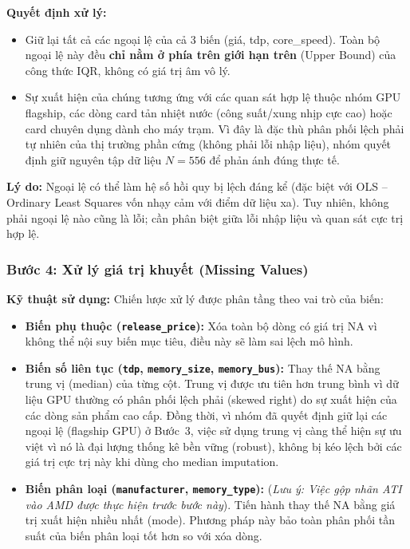 \documentclass[12pt,a4paper]{article}
\begin{document}
\textbf{Quyết định xử lý:}

\begin{itemize}[leftmargin=1.5em]
  \item Giữ lại tất cả các ngoại lệ của cả 3 biến (giá, tdp, core\_speed). Toàn bộ
        ngoại lệ này đều \textbf{chỉ nằm ở phía trên giới hạn trên} (Upper Bound) của
        công thức IQR, không có giá trị âm vô lý.

  \item Sự xuất hiện của chúng tương ứng với các quan sát hợp lệ thuộc nhóm GPU flagship,
        các dòng card tản nhiệt nước (công suất/xung nhịp cực cao) hoặc card chuyên dụng
        dành cho máy trạm. Vì đây là đặc thù phân phối lệch phải tự nhiên của thị trường
        phần cứng (không phải lỗi nhập liệu), nhóm quyết định giữ nguyên tập dữ liệu
        $N = 556$ để phản ánh đúng thực tế.
\end{itemize}

\textbf{Lý do:} Ngoại lệ có thể làm hệ số hồi quy bị lệch đáng kể (đặc biệt với OLS --
Ordinary Least Squares vốn nhạy cảm với điểm dữ liệu xa). Tuy nhiên, không phải ngoại lệ
nào cũng là lỗi; cần phân biệt giữa lỗi nhập liệu và quan sát cực trị hợp lệ.

\subsubsection*{Bước 4: Xử lý giá trị khuyết (Missing Values)}

\textbf{Kỹ thuật sử dụng:} Chiến lược xử lý được phân tầng theo vai trò của biến:

\begin{itemize}[leftmargin=1.5em]
  \item \textbf{Biến phụ thuộc (\texttt{release\_price}):} Xóa toàn bộ dòng có giá trị
        NA vì không thể nội suy biến mục tiêu, điều này sẽ làm sai lệch mô hình.

  \item \textbf{Biến số liên tục (\texttt{tdp}, \texttt{memory\_size},
        \texttt{memory\_bus}):} Thay thế NA bằng trung vị (median) của từng cột. Trung vị
        được ưu tiên hơn trung bình vì dữ liệu GPU thường có phân phối lệch phải
        (skewed right) do sự xuất hiện của các dòng sản phẩm cao cấp. Đồng thời, vì nhóm
        đã quyết định giữ lại các ngoại lệ (flagship GPU) ở Bước~3, việc sử dụng trung vị
        càng thể hiện sự ưu việt vì nó là đại lượng thống kê bền vững (robust), không bị
        kéo lệch bởi các giá trị cực trị này khi dùng cho median imputation.

  \item \textbf{Biến phân loại (\texttt{manufacturer}, \texttt{memory\_type}):}
        (\textit{Lưu ý: Việc gộp nhãn ATI vào AMD được thực hiện trước bước này}).  Tiến
        hành thay thế NA bằng giá trị xuất hiện nhiều nhất (mode). Phương pháp này bảo
        toàn phân phối tần suất của biến phân loại tốt hơn so với xóa dòng.
\end{itemize}
\end{document}
